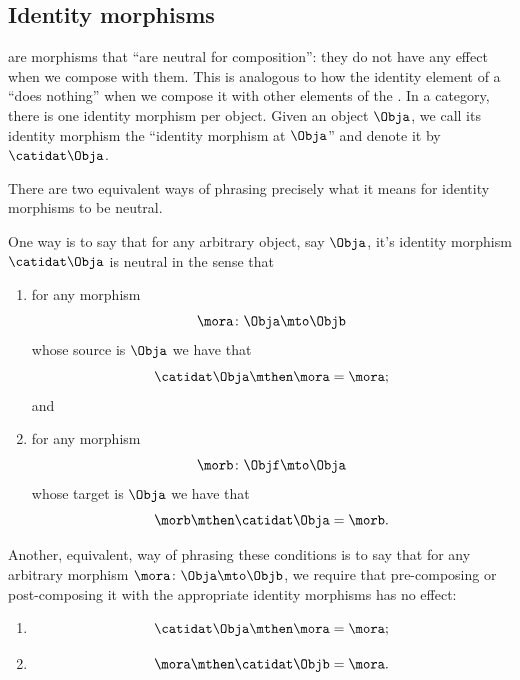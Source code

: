 \subsection{Identity morphisms}

 are morphisms that ``are neutral for composition'': they do not have any effect when we compose with them. This is analogous to how the identity element of a  ``does nothing'' when we compose it with other elements of the . In a category, there is one identity morphism per object. Given an object $\Obja$, we call its identity morphism the ``identity morphism at $\Obja$'' and denote it by $\catidat\Obja$.  

There are two equivalent ways of phrasing precisely what it means for identity morphisms to be neutral. 

One way is to say that for any arbitrary object, say $\Obja$, it's identity morphism $\catidat\Obja$ is neutral in the sense that
\begin{enumerate}
\item for any morphism 
\begin{equation}
\mora \colon \Obja \mto \Objb
\end{equation}
whose source is $\Obja$ we have that 
\begin{equation}\label{eq:identities-unitality-1}
\catidat\Obja \mthen \mora  = \mora;
\end{equation}
and
\item for any morphism 
\begin{equation}
\morb \colon \Objf \mto \Obja
\end{equation}
whose target is $\Obja$ we have that 
\begin{equation}\label{eq:identities-unitality-2}
\morb \mthen \catidat\Obja = \morb.
\end{equation}
\end{enumerate}

Another, equivalent, way of phrasing these conditions is to say that for any arbitrary morphism $\mora \colon \Obja \mto \Objb$, we require that pre-composing or post-composing it with the appropriate identity morphisms has no effect:  
\begin{enumerate}
\item  
\begin{equation}
\catidat\Obja \mthen \mora = \mora;
\end{equation}
\item  
\begin{equation}
\mora \mthen \catidat\Objb = \mora.
\end{equation}
\end{enumerate}

